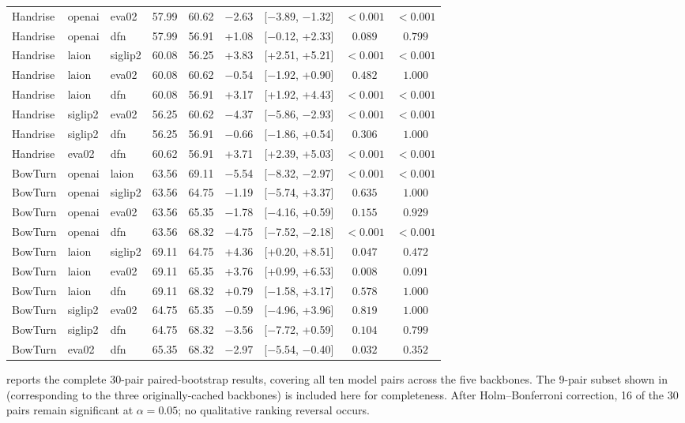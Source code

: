 \documentclass[symmetry,article,submit,pdftex,moreauthors]{Definitions/mdpi}
\begin{document}
\begin{table}[H]
\begin{tabular}{l l l c c r r c c}
Handrise & openai & eva02 & 57.99 & 60.62 & $-$2.63 & [$-$3.89, $-$1.32] & $<0.001$ & $<0.001$ \\
Handrise & openai & dfn & 57.99 & 56.91 & +1.08 & [$-$0.12, +2.33] & $0.089$ & $0.799$ \\
Handrise & laion & siglip2 & 60.08 & 56.25 & +3.83 & [+2.51, +5.21] & $<0.001$ & $<0.001$ \\
Handrise & laion & eva02 & 60.08 & 60.62 & $-$0.54 & [$-$1.92, +0.90] & $0.482$ & $1.000$ \\
Handrise & laion & dfn & 60.08 & 56.91 & +3.17 & [+1.92, +4.43] & $<0.001$ & $<0.001$ \\
Handrise & siglip2 & eva02 & 56.25 & 60.62 & $-$4.37 & [$-$5.86, $-$2.93] & $<0.001$ & $<0.001$ \\
Handrise & siglip2 & dfn & 56.25 & 56.91 & $-$0.66 & [$-$1.86, +0.54] & $0.306$ & $1.000$ \\
Handrise & eva02 & dfn & 60.62 & 56.91 & +3.71 & [+2.39, +5.03] & $<0.001$ & $<0.001$ \\
\midrule
BowTurn & openai & laion & 63.56 & 69.11 & $-$5.54 & [$-$8.32, $-$2.97] & $<0.001$ & $<0.001$ \\
BowTurn & openai & siglip2 & 63.56 & 64.75 & $-$1.19 & [$-$5.74, +3.37] & $0.635$ & $1.000$ \\
BowTurn & openai & eva02 & 63.56 & 65.35 & $-$1.78 & [$-$4.16, +0.59] & $0.155$ & $0.929$ \\
BowTurn & openai & dfn & 63.56 & 68.32 & $-$4.75 & [$-$7.52, $-$2.18] & $<0.001$ & $<0.001$ \\
BowTurn & laion & siglip2 & 69.11 & 64.75 & +4.36 & [+0.20, +8.51] & $0.047$ & $0.472$ \\
BowTurn & laion & eva02 & 69.11 & 65.35 & +3.76 & [+0.99, +6.53] & $0.008$ & $0.091$ \\
BowTurn & laion & dfn & 69.11 & 68.32 & +0.79 & [$-$1.58, +3.17] & $0.578$ & $1.000$ \\
BowTurn & siglip2 & eva02 & 64.75 & 65.35 & $-$0.59 & [$-$4.96, +3.96] & $0.819$ & $1.000$ \\
BowTurn & siglip2 & dfn & 64.75 & 68.32 & $-$3.56 & [$-$7.72, +0.59] & $0.104$ & $0.799$ \\
BowTurn & eva02 & dfn & 65.35 & 68.32 & $-$2.97 & [$-$5.54, $-$0.40] & $0.032$ & $0.352$ \\
\bottomrule
\end{tabular}
\end{table}

\noindent{} reports the complete 30-pair paired-bootstrap results, covering all ten model pairs across the five backbones. The 9-pair subset shown in  (corresponding to the three originally-cached backbones) is included here for completeness. After Holm--Bonferroni correction, 16 of the 30 pairs remain significant at $\alpha=0.05$; no qualitative ranking reversal occurs.
\end{document}
